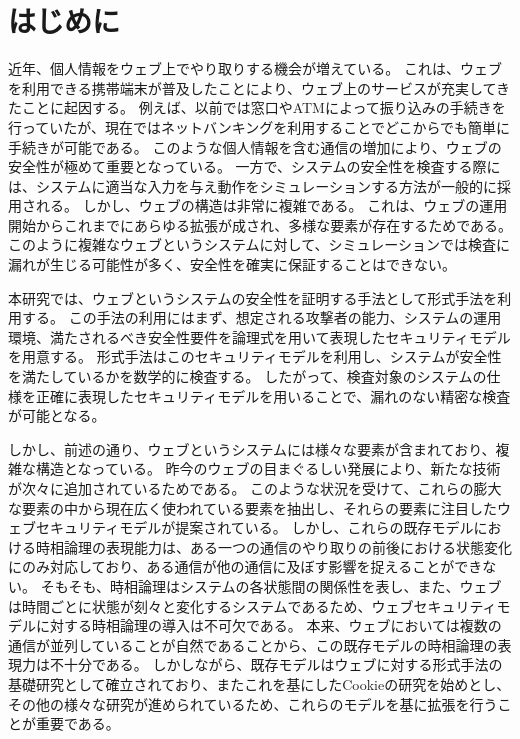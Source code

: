 \documentclass[12pt,a4paper]{jbook}
\begin{document}
\newpage

\chapter{はじめに}
\label{sec:introduction}
近年、個人情報をウェブ上でやり取りする機会が増えている。
これは、ウェブを利用できる携帯端末が普及したことにより、ウェブ上のサービスが充実してきたことに起因する。
例えば、以前では窓口やATMによって振り込みの手続きを行っていたが、現在ではネットバンキングを利用することでどこからでも簡単に手続きが可能である。
このような個人情報を含む通信の増加により、ウェブの安全性が極めて重要となっている。
一方で、システムの安全性を検査する際には、システムに適当な入力を与え動作をシミュレーションする方法が一般的に採用される。
しかし、ウェブの構造は非常に複雑である。
これは、ウェブの運用開始からこれまでにあらゆる拡張が成され、多様な要素が存在するためである。
このように複雑なウェブというシステムに対して、シミュレーションでは検査に漏れが生じる可能性が多く、安全性を確実に保証することはできない。

本研究では、ウェブというシステムの安全性を証明する手法として形式手法を利用する。
この手法の利用にはまず、想定される攻撃者の能力、システムの運用環境、満たされるべき安全性要件を論理式を用いて表現したセキュリティモデルを用意する。
形式手法はこのセキュリティモデルを利用し、システムが安全性を満たしているかを数学的に検査する。
したがって、検査対象のシステムの仕様を正確に表現したセキュリティモデルを用いることで、漏れのない精密な検査が可能となる。

しかし、前述の通り、ウェブというシステムには様々な要素が含まれており、複雑な構造となっている。
昨今のウェブの目まぐるしい発展により、新たな技術が次々に追加されているためである。
このような状況を受けて、これらの膨大な要素の中から現在広く使われている要素を抽出し、それらの要素に注目したウェブセキュリティモデルが提案されている\cite{based-model,cookie-model}。
しかし、これらの既存モデルにおける時相論理の表現能力は、ある一つの通信のやり取りの前後における状態変化にのみ対応しており、ある通信が他の通信に及ぼす影響を捉えることができない。
そもそも、時相論理はシステムの各状態間の関係性を表し、また、ウェブは時間ごとに状態が刻々と変化するシステムであるため、ウェブセキュリティモデルに対する時相論理の導入は不可欠である。
本来、ウェブにおいては複数の通信が並列していることが自然であることから、この既存モデルの時相論理の表現力は不十分である。
しかしながら、既存モデル\cite{based-model}はウェブに対する形式手法の基礎研究として確立されており、またこれを基にしたCookieの研究\cite{cookie-model}を始めとし、その他の様々な研究\cite{chaitanya2017formal, bagheri2016practical, chen2015aspire, nelson2013aluminum, somorovsky2011all}が進められているため、これらのモデルを基に拡張を行うことが重要である。
\end{document}
